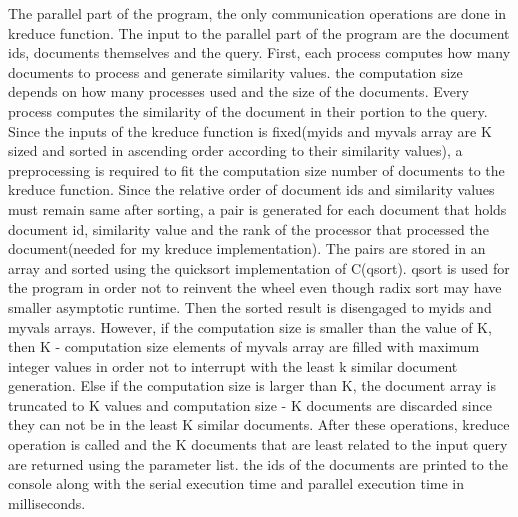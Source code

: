 \documentclass{article}
\begin{document}
\null \qquad The parallel part of the program, the only communication operations are done in kreduce function. The input to the parallel part of the program are the document ids, documents themselves and the query. First, each process computes how many documents to process and generate similarity values. the computation size depends on how many processes used and the size of the documents. Every process computes the similarity of the document in their portion to the query. Since the inputs of the kreduce function is fixed(myids and myvals array are K sized and sorted in ascending order according to their similarity values), a preprocessing is required to fit the computation size number of documents to the kreduce function. Since the relative order of document ids and similarity values must remain same after sorting, a pair is generated for each document that holds document id, similarity value and the rank of the processor that processed the document(needed for my kreduce implementation). The pairs are stored in an array and sorted using the quicksort implementation of C(qsort). qsort is used for the program in order not to reinvent the wheel even though radix sort may have smaller asymptotic runtime. Then the sorted result is disengaged to myids and myvals arrays. However, if the computation size is smaller than the value of K, then K - computation size elements of myvals array are filled with maximum integer values in order not to interrupt with the least k similar document generation. Else if the computation size is larger than K, the document array is truncated to K values and computation size - K documents are discarded since they can not be in the least K similar documents. After these operations, kreduce operation is called and the K documents that are least related to the  input query are returned using the parameter list. the ids of the documents are printed to the console along with the serial execution time and parallel execution time in milliseconds.
\end{document}

